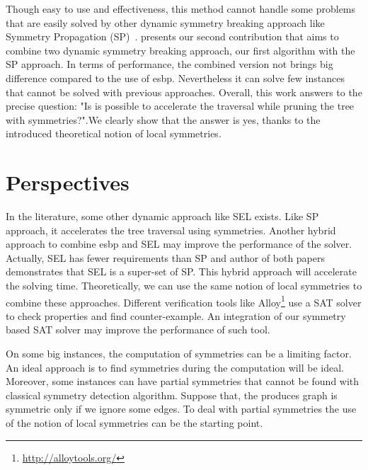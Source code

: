 Though easy to use and effectiveness, this method cannot handle some problems that are easily solved by other
dynamic symmetry breaking approach like Symmetry Propagation (SP)~\cite{Devriendt12}.
 presents our second contribution that aims to combine two dynamic symmetry breaking approach, our first algorithm  with the SP approach. In terms of performance, the combined version not brings big difference
compared to the use of esbp. Nevertheless it can solve few instances that cannot be solved with previous approaches.
Overall,  this  work  answers  to  the  precise  question: "Is is possible to accelerate the traversal while pruning the tree
with symmetries?".We clearly show that the answer is yes, thanks to the introduced theoretical notion of local symmetries.


%
%
%
%
%
%
%
%
%

\section{Perspectives}
In the literature, some other dynamic approach like SEL\cite{devriendt2017symmetric} exists. Like SP approach,
it accelerates the tree traversal using symmetries. Another hybrid approach to combine esbp and SEL may improve the
performance of the solver. Actually, SEL has fewer requirements than SP and author of both papers demonstrates that
SEL is a super-set of SP. This hybrid approach will accelerate the solving time.
Theoretically, we can use the same notion of local symmetries to combine these approaches.
Different verification tools like Alloy\footnote{\url{http://alloytools.org/}} use a SAT solver to check properties and find
counter-example. An integration of our symmetry based SAT solver may improve the performance of such tool.


On some big instances, the computation of symmetries can be a limiting factor. An ideal approach is to find 
symmetries during the computation will be ideal. Moreover, some instances can have partial symmetries that cannot be 
found with classical symmetry detection algorithm. Suppose that, the produces graph is symmetric only if we ignore some 
edges. To deal with partial symmetries the use of the notion of local symmetries can be the starting point.



